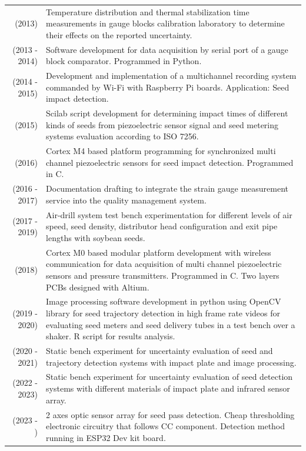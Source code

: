 \documentclass[a4paper,10pt, sans]{article}
\begin{document}
\begin{table}[H]
\begin{tabularx}{\textwidth}{r X}
        (2013) & Temperature distribution and thermal stabilization time measurements in gauge blocks calibration laboratory to determine their effects on the reported uncertainty. \\ [1ex]
        (2013 - 2014) & Software development for data acquisition by serial port of a gauge block comparator. Programmed in Python.\\ [1ex]
        (2014 - 2015) & Development and implementation of a multichannel recording system commanded by Wi-Fi with Raspberry Pi boards. Application: Seed impact detection. \\ [1ex]
        (2015) & Scilab script development for determining impact times of different kinds of seeds from piezoelectric sensor signal and seed metering systems evaluation according to ISO 7256. \\ [1ex]
        (2016) & Cortex M4 based platform programming for synchronized multi channel piezoelectric sensors for seed impact detection. Programmed in C.\\ [1ex]
        (2016 - 2017) & Documentation drafting to integrate the strain gauge measurement service into the quality management system. \\ [1ex]
        (2017 - 2019) & Air-drill system test bench experimentation for different levels of air speed, seed density, distributor head configuration and exit pipe lengths with soybean seeds. \\ [1ex]
        (2018) & Cortex M0 based modular platform development with wireless communication for data acquisition of multi channel piezoelectric sensors and pressure transmitters. Programmed in C. Two layers PCBs designed with Altium.\\ [1ex]
        (2019 - 2020) & Image processing software development in python using OpenCV library for seed trajectory detection in high frame rate videos for evaluating seed meters and seed delivery tubes in a test bench over a shaker. R script for results analysis. \\ [1ex]
        (2020 - 2021) & Static bench experiment for uncertainty evaluation of seed and trajectory detection systems with impact plate and image processing. \\ [1ex]        
        (2022 - 2023) & Static bench experiment for uncertainty evaluation of seed detection systems with different materials of impact plate and infrared sensor array. \\ [1ex]  
        (2023 - ) & 2 axes optic sensor array for seed pass detection. Cheap thresholding electronic circuitry that follows CC component. Detection method running in ESP32 Dev kit board.\\
  \end{tabularx}
  \end{table}
\end{document}
